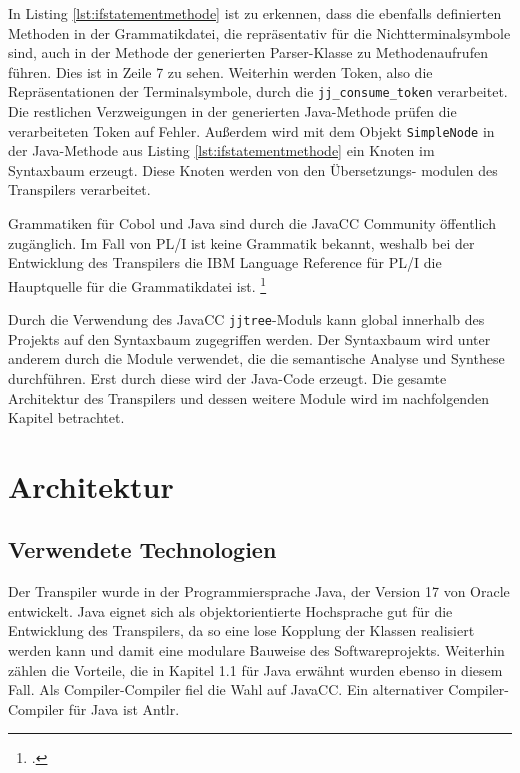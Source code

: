 In Listing \ref{lst:ifstatementmethode} ist zu erkennen, dass die ebenfalls definierten Methoden in der Grammatikdatei, die repräsentativ für die Nichtterminalsymbole sind, auch in der Methode der generierten Parser-Klasse zu Methodenaufrufen führen. Dies ist in Zeile 7 zu sehen. Weiterhin werden Token, also die Repräsentationen der Terminalsymbole, durch die \verb+jj_consume_token+ verarbeitet. Die restlichen Verzweigungen in der generierten Java-Methode prüfen die verarbeiteten Token auf Fehler. Außerdem wird mit dem Objekt \verb+SimpleNode+ in der Java-Methode aus Listing \ref{lst:ifstatementmethode} ein Knoten im Syntaxbaum erzeugt. Diese Knoten werden von den Übersetzungs- \newline modulen des Transpilers verarbeitet.

\pagebreak
Grammatiken für Cobol und Java sind durch die JavaCC Community öffentlich zugänglich. Im Fall von PL/I ist keine Grammatik bekannt, weshalb bei der Entwicklung des Transpilers die IBM Language Reference für PL/I die Hauptquelle für die Grammatikdatei ist.  \footcite[Vgl. ][]{javaccdoku}

Durch die Verwendung des JavaCC \verb+jjtree+-Moduls kann global innerhalb des Projekts auf den Syntaxbaum zugegriffen werden. 
Der Syntaxbaum wird unter anderem durch die Module verwendet, die die semantische Analyse und Synthese durchführen.
Erst durch diese wird der Java-Code erzeugt.
Die gesamte Architektur des Transpilers und dessen weitere Module wird im nachfolgenden Kapitel betrachtet. 
\pagebreak
\section{Architektur}
\subsection{Verwendete Technologien}

Der Transpiler wurde in der Programmiersprache Java, der Version 17 von Oracle entwickelt. 
Java eignet sich als objektorientierte Hochsprache gut für die Entwicklung des Transpilers, da so eine lose Kopplung der Klassen realisiert werden kann und damit eine modulare Bauweise des Softwareprojekts. Weiterhin zählen die Vorteile, die in Kapitel 1.1 für Java erwähnt wurden ebenso in diesem Fall.  Als Compiler-Compiler fiel die Wahl auf JavaCC. Ein alternativer Compiler-Compiler für Java ist Antlr. 

